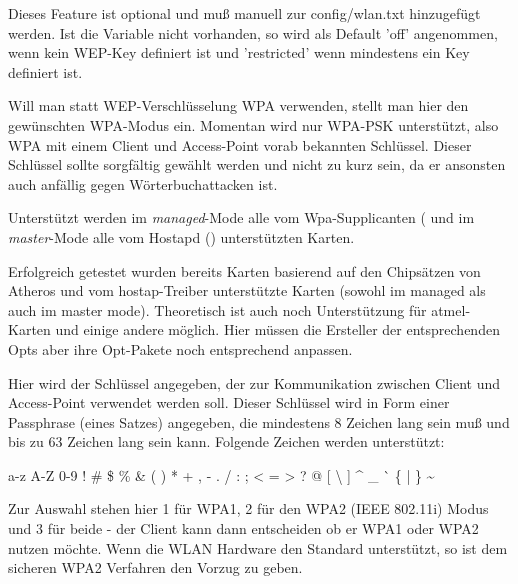 \begin{description}
        Dieses Feature ist optional und muß manuell zur config/wlan.txt hinzugefügt werden.
        Ist die Variable nicht vorhanden, so wird als Default 'off' angenommen, wenn kein WEP-Key definiert ist und 'restricted' wenn mindestens ein Key definiert ist.


Will man statt WEP-Verschlüsselung WPA verwenden, stellt man hier den
gewünschten WPA-Modus ein. Momentan wird nur WPA-PSK unterstützt, also
WPA mit einem Client und Access-Point vorab bekannten Schlüssel. Dieser
Schlüssel sollte sorgfältig gewählt werden und nicht zu kurz sein, da
er ansonsten auch anfällig gegen Wörterbuchattacken ist.

Unterstützt werden im \emph{managed}-Mode alle vom Wpa-Supplicanten
( 
und im \emph{master}-Mode alle vom Hostapd
() unterstützten Karten.

Erfolgreich getestet wurden bereits Karten basierend auf den 
Chipsätzen von Atheros und vom hostap-Treiber
unterstützte Karten (sowohl im managed als auch im master mode). Theoretisch ist auch noch Unterstützung für
atmel-Karten und
einige andere möglich. Hier müssen die Ersteller der entsprechenden
Opts aber ihre Opt-Pakete noch entsprechend anpassen.


      Hier wird der Schlüssel angegeben, der zur Kommunikation zwischen
      Client und Access-Point verwendet werden soll. Dieser Schlüssel wird in Form einer Passphrase 
      (eines Satzes) angegeben, die mindestens 8 Zeichen lang sein muß und bis zu 63 Zeichen lang sein kann. 
      Folgende Zeichen werden unterstützt:

      a-z A-Z 0-9 ! \# \$ \% \& ( ) * + , - . / : ; {\textless} = {\textgreater} ? @ [ {\textbackslash} ] \^{} \_ \`{} \{ | \} {\textasciitilde}


      Zur Auswahl stehen hier 1 für WPA1, 2 für den WPA2 (IEEE 802.11i) Modus
      und 3 für beide - der Client kann dann entscheiden ob er WPA1 oder
      WPA2 nutzen möchte.
      Wenn die WLAN Hardware den Standard unterstützt, so ist dem sicheren WPA2 
      Verfahren den Vorzug zu geben.



\end{description}
